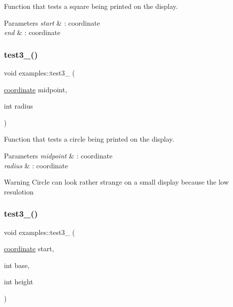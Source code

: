 Function that tests a square being printed on the display. 


\begin{DoxyParams}{Parameters}
{\em start} & \+: coordinate \\
\hline
{\em end} & \+: coordinate \\
\hline
\end{DoxyParams}
\mbox{\label{classexamples_aae40706381a96805c7be020ef1763696}} 
\subsubsection{\texorpdfstring{test3\+\_()}{test3\_3()}}
{\footnotesize\ttfamily void examples\+::test3\+\_ (\begin{DoxyParamCaption}\item[{\hyperlink{classcoordinate}{coordinate}}]{midpoint,  }\item[{int}]{radius }\end{DoxyParamCaption})\hspace{0.3cm}{\ttfamily [inline]}}



Function that tests a circle being printed on the display. 


\begin{DoxyParams}{Parameters}
{\em midpoint} & \+: coordinate \\
\hline
{\em radius} & \+: coordinate \\
\hline
\end{DoxyParams}
\begin{DoxyWarning}{Warning}
Circle can look rather strange on a small display because the low resulotion 
\end{DoxyWarning}
\mbox{\label{classexamples_a8dab7396ebffe15c572f2488d2e3edc0}} 
\subsubsection{\texorpdfstring{test3\+\_()}{test3\_4()}}
{\footnotesize\ttfamily void examples\+::test3\+\_ (\begin{DoxyParamCaption}\item[{\hyperlink{classcoordinate}{coordinate}}]{start,  }\item[{int}]{base,  }\item[{int}]{height }\end{DoxyParamCaption})\hspace{0.3cm}{\ttfamily [inline]}}



